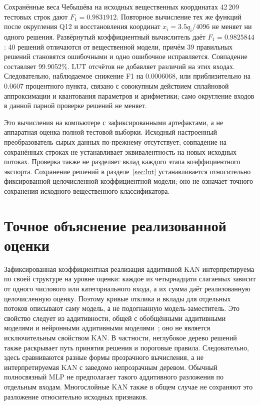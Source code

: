 Сохранённые веса Чебышёва на исходных вещественных координатах 42\,209 тестовых строк дают $F_1=0.9831912$. Повторное вычисление тех же функций после округления Q12 и восстановления координат $x_i=3.5q_i/4096$ не меняет ни одного решения. Развёрнутый коэффициентный вычислитель даёт $F_1=0.9825844$: 40 решений отличаются от вещественной модели, причём 39 правильных решений становятся ошибочными и одно ошибочное исправляется. Совпадение составляет 99.9052\%. LUT отсчётов не добавляет различий на этих входах. Следовательно, наблюдаемое снижение F1 на $0.0006068$, или приблизительно на 0.0607 процентного пункта, связано с совокупным действием сплайновой аппроксимации и квантования параметров и арифметики; само округление входов в данной парной проверке решений не меняет.

Это вычисления на компьютере с зафиксированными артефактами, а не аппаратная оценка полной тестовой выборки. Исходный настроенный преобразователь сырых данных по-прежнему отсутствует; совпадение на сохранённых строках не устанавливает эквивалентность на новых исходных потоках. Проверка также не разделяет вклад каждого этапа коэффициентного экспорта. Сохранение решений в разделе~\ref{sec:lut} устанавливается относительно фиксированной целочисленной коэффициентной модели; оно не означает точного сохранения исходного вещественного классификатора.

\section{Точное объяснение реализованной оценки}
Зафиксированная коэффициентная реализация аддитивной KAN интерпретируема по своей структуре на уровне оценки: каждое из четырнадцати слагаемых зависит от одного числового или категориального входа, а их сумма даёт реализованную целочисленную оценку. Поэтому кривые отклика и вклады для отдельных потоков описывают саму модель, а не подогнанную модель-заместитель. Это свойство следует из аддитивности, общей с обобщёнными аддитивными моделями и нейронными аддитивными моделями~\cite{agarwal2021nam}; оно не является исключительным свойством KAN. В частности, неглубокое дерево решений также раскрывает путь принятия решения и пороговые правила. Следовательно, здесь сравниваются разные формы прозрачного вычисления, а не интерпретируемая KAN с заведомо непрозрачным деревом. Обычный полносвязный MLP не предполагает такого аддитивного разложения по отдельным входам. Многослойные KAN также в общем случае не сохраняют это разложение относительно исходных признаков.

